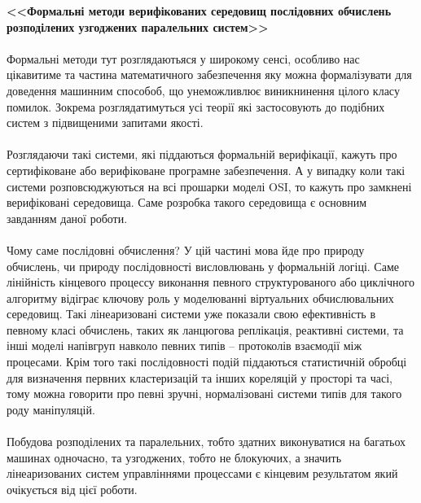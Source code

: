 \documentclass[11pt,oneside]{article}
\begin{document}
   {\bf <<Формальні методи верифікованих середовищ послідовних обчислень розподілених узгоджених паралельних систем>>}

\vspace{0.5cm}

   \paragraph{}
   Формальні методи тут розглядаютьяся у широкому сенсі, особливо нас цікавитиме
   та частина математичного забезпечення яку можна формалізувати для доведення
   машинним способоб, що унеможливлює виникнинення цілого класу помилок.
   Зокрема розглядатимуться усі теорії які застосовують до подібних систем
   з підвищеними запитами якості.

   \paragraph{}
   Розглядаючи такі системи, які піддаються формальній верифікації, кажуть про
   сертифіковане або верифіковане програмне забезпечення. А у випадку коли такі
   системи розповсюджуються на всі прошарки моделі OSI, то кажуть про замкнені
   верифіковані середовища. Саме розробка такого середовища є основним завданням даної роботи.

   \paragraph{}
   Чому саме послідовні обчислення? У цій частині мова йде про природу обчислень,
   чи природу послідовності висловлювань у формальній логіці. Саме лінійність кінцевого
   процессу виконання певного структурованого або циклічного алгоритму відіграє ключову
   роль у моделюванні віртуальних обчислювальних середовищ. Такі лінеаризовані системи
   уже показали свою ефективність в певному класі обчислень, таких як ланцюгова реплікація,
   реактивні системи, та інші моделі напівгруп навколо певних типів -- протоколів взаємодії між процесами.
   Крім того такі послідовності подій піддаються статистичній обробці для визначення первних кластеризацій
   та інших кореляцій у просторі та часі, тому можна говорити про певні зручні, нормалізовані системи типів для
   такого роду маніпуляцій.

   \paragraph{}
   Побудова розподілених та паралельних, тобто здатних виконуватися на багатьох машинах одночасно, та
   узгоджених, тобто не блокуючих, а значить лінеаризованих систем управліннями процессами є кінцевим
   результатом який очікується від цієї роботи.
\end{document}
